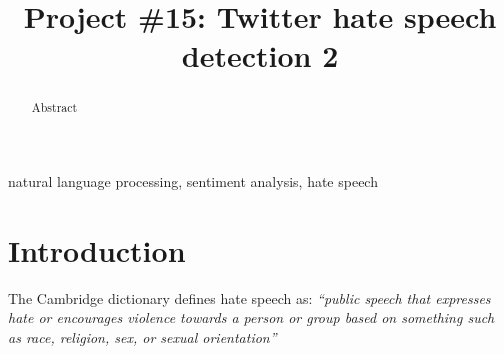 \documentclass[conference]{IEEEtran}
\begin{document}
\title{Project \#15: Twitter hate speech detection 2\\
}

\author{
\and
{}
\and
{}
\and
{}
}

\maketitle

\begin{abstract}
Abstract
\end{abstract}

\begin{IEEEkeywords}
natural language processing, sentiment analysis, hate speech
\end{IEEEkeywords}
\section{Introduction}
The Cambridge dictionary defines hate speech as:
\vspace{12pt}
\emph{``public speech that expresses hate or encourages violence towards a person or group based on something
such as race, religion, sex, or sexual orientation''} \cite{Cambridge:hate_speech}
\vspace{12pt}
\end{document}

